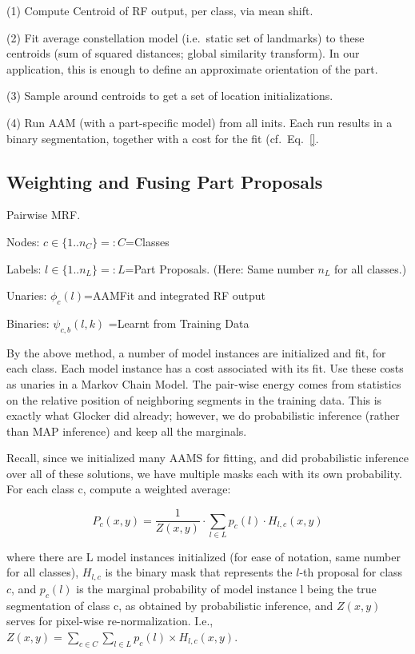 \documentclass[10pt,twocolumn,letterpaper]{article}
\begin{document}
(1) Compute Centroid of RF output, per class, via mean shift. 

(2) Fit average constellation model (i.e.\ static set of landmarks) to these centroids (sum of squared distances; global similarity transform). In our application, this is enough to define an approximate orientation of the part. 

(3) Sample around centroids to get a set of location initializations. 

(4) Run AAM (with a part-specific model) from all inits. Each run results in a binary segmentation, together with a cost for the fit (cf.\ Eq.\ \eqref{}. 

\subsection{Weighting and Fusing Part Proposals}
\label{subsec:weightsAndFusion}

Pairwise MRF.

Nodes: $c\in \{1..n_C\}=:C$=Classes

Labels: $l\in \{1..n_L\}=:L$=Part Proposals. (Here: Same number $n_L$ for all classes.)

Unaries: $\phi_c(l)$=AAMFit and integrated RF output

Binaries: $\psi_{c,b}(l,k)$ =Learnt from Training Data

By the above method, a number of model instances are initialized and fit, for each class.  Each model instance has a cost associated with its fit.  Use these costs as unaries in a Markov Chain Model.  The pair-wise energy comes from statistics on the relative position of neighboring segments in the training data.  This is exactly what Glocker did already; however, we do probabilistic inference (rather than MAP inference) and keep all the marginals.

Recall, since we initialized many AAMS for fitting, and did probabilistic inference over all of these solutions, we have multiple masks each with its own probability.  For each class c, compute a weighted average:

\[ P_c(x,y) = \frac{1}{Z(x,y)} \cdot \sum_{l\in L} p_c(l)\cdot H_{l,c}(x,y) \]

where there are L model instances initialized (for ease of notation, same number for all classes), $H_{l,c}$ is the binary mask that represents the $l$-th proposal for class $c$, and $p_c(l)$ is the marginal probability of model instance l being the true segmentation of class c, as obtained by probabilistic inference, and $Z(x,y)$ serves for pixel-wise re-normalization. I.e., $Z(x,y)=\sum_{c\in C}\sum_{l\in L} p_c(l)\times H_{l,c}(x,y)$.
\end{document}
